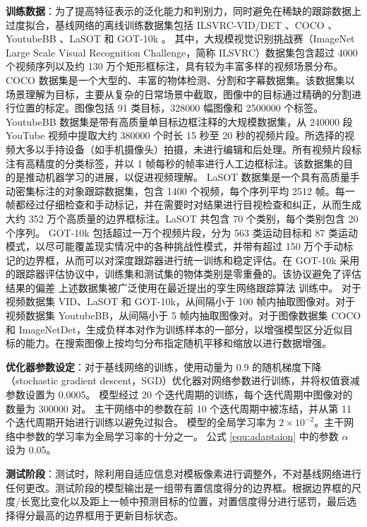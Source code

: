 \textbf{训练数据}：为了提高特征表示的泛化能力和判别力，同时避免在稀缺的跟踪数据上过度拟合，基线网络的离线训练数据集包括 ILSVRC-VID/DET \cite{VID}、COCO \cite{COCO}、YoutubeBB \cite{real2017youtube}、LaSOT \cite{LaSOT} 和 GOT-10k \cite{GOT-10k}。
其中，大规模视觉识别挑战赛（ImageNet Large Scale Visual Recognition Challenge，简称 ILSVRC）数据集包含超过 4000 个视频序列以及约 130 万个矩形框标注，具有较为丰富多样的视频场景分布。
COCO 数据集是一个大型的、丰富的物体检测、分割和字幕数据集。该数据集以场景理解为目标，主要从复杂的日常场景中截取，图像中的目标通过精确的分割进行位置的标定。图像包括 91 类目标，328000 幅图像和 2500000 个标签。
YoutubeBB 数据集是带有高质量单目标边框注释的大规模数据集，从 240000 段 YouTube 视频中提取大约 380000 个时长 15 秒至 20 秒的视频片段。所选择的视频大多以手持设备（如手机摄像头）拍摄，未进行编辑和后处理。所有视频片段标注有高精度的分类标签，并以 1 帧每秒的帧率进行人工边框标注。该数据集的目的是推动机器学习的进展，以促进视频理解。
LaSOT 数据集是一个具有高质量手动密集标注的对象跟踪数据集，包含 1400 个视频，每个序列平均 2512 帧。每一帧都经过仔细检查和手动标记，并在需要时对结果进行目视检查和纠正，从而生成大约 352 万个高质量的边界框标注。LaSOT 共包含 70 个类别，每个类别包含 20 个序列。
GOT-10k \cite{GOT-10k} 包括超过一万个视频片段，分为 563 类运动目标和 87 类运动模式，以尽可能覆盖现实情况中的各种挑战性模式，并带有超过 150 万个手动标记的边界框，从而可以对深度跟踪器进行统一训练和稳定评估。在 GOT-10k 采用的跟踪器评估协议中，训练集和测试集的物体类别是零重叠的。该协议避免了评估结果的偏差
上述数据集被广泛使用在最近提出的孪生网络跟踪算法 \cite{SiamRPN++,Wang2018SiamMask} 训练中。
对于视频数据集 VID、LaSOT 和 GOT-10k，从间隔小于 100 帧内抽取图像对。对于视频数据集 YoutubeBB，从间隔小于 5 帧内抽取图像对。对于图像数据集 COCO 和 ImageNetDet，生成负样本对作为训练样本的一部分，以增强模型区分近似目标的能力。在搜索图像上按均匀分布指定随机平移和缩放以进行数据增强。

\textbf{优化器参数设定}：对于基线网络的训练，使用动量为 0.9 的随机梯度下降（stochastic gradient descent，SGD）优化器对网络参数进行训练，并将权值衰减参数设置为 0.0005。
模型经过 20 个迭代周期的训练，每个迭代周期中图像对的数量为 300000 对。
主干网络中的参数在前 10 个迭代周期中被冻结，并从第 11 个迭代周期开始进行训练以避免过拟合。
模型的全局学习率为 $2\times 10^{-2}$。主干网络中参数的学习率为全局学习率的十分之一。
公式 \ref{equ:adaptaion} 中的参数 $\alpha$ 设为 0.05。

\textbf{测试阶段}：测试时，除利用自适应信息对模板像素进行调整外，不对基线网络进行任何更改。测试阶段的模型输出是一组带有置信度得分的边界框。根据边界框的尺度/长宽比变化以及距上一帧中预测目标的位置，对置信度得分进行惩罚，最后选择得分最高的边界框用于更新目标状态。

